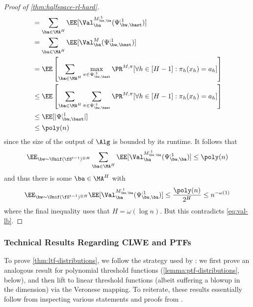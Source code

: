 \begin{proof}[Proof of \cref{thm:halfspace-rl-hard}]
\begin{align*}
&= \sum_{\ba \in \MA^H} \EE[\Val^{M^{:1}_{\bw,\ba}}_{\ba}(\Psi^{:1}_{\bw,\bast})] \\ 
&= \sum_{\ba \in \MA^H} \EE[\Val^{M}_{\ba}(\Psi^{:1}_{\bw,\bast})] \\ 
&= \EE\left[\sum_{\ba \in \MA^H} \max_{\pi \in \Psi^{:1}_{\bw,\bast}}\Pr^{M, \pi}[\forall h \in [H-1]: \pi_h(x_h) = a_h]\right] \\ 
&\leq \EE\left[\sum_{\ba \in \MA^H} \sum_{\pi \in \Psi^{:1}_{\bw,\bast}}\Pr^{M, \pi}[\forall h \in [H-1]: \pi_h(x_h) = a_h]\right] \\ 
&\leq \EE[|\Psi^{:1}_{\bw,\bast}|] \\ 
&\leq \poly(n)
\end{align*}
since the size of the output of $\Alg$ is bounded by its runtime. It follows that
\[\EE_{\bw\sim\Unif(\fS^{t-1})^{\otimes H}}\sum_{\ba \in \MA^H} \EE[\Val^{M^{:1}_{\bw,\ba}}_{\ba}(\Psi^{:1}_{\bw,\ba})] \leq \poly(n)\]
and thus there is some $\ba \in \MA^H$ with
\[\EE_{\bw\sim\Unif(\fS^{t-1})^{\otimes H}}\EE[\Val^{M^{:1}_{\bw,\ba}}_{\ba}(\Psi^{:1}_{\bw,\ba})] \leq \frac{\poly(n)}{2^H} \leq n^{-\omega(1)}\]
where the final inequality uses that $H = \omega(\log n)$. But this contradicts \cref{eq:val-lb}.
\end{proof}

\subsubsection{Technical Results Regarding CLWE and PTFs}\label{subsec:halfspace-technical}

To prove \cref{thm:ltf-distributions}, we follow the strategy used by \cite{tiegel2023hardness}: we first prove an analogous result for polynomial threshold functions (\cref{lemma:ptf-distributions}, below), and then lift to linear threshold functions (albeit suffering a blowup in the dimension) via the Veronese mapping. To reiterate, these results essentially follow from inspecting various statements and proofs from \cite{tiegel2023hardness}.

